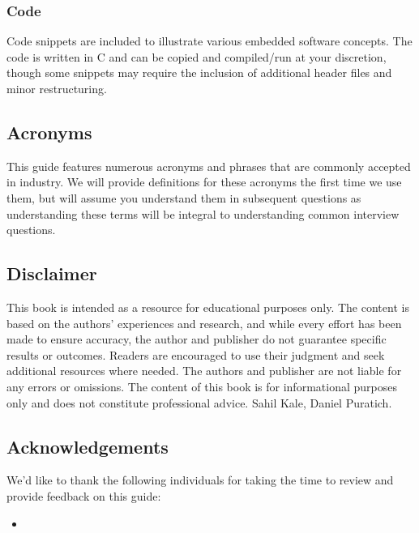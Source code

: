 \documentclass[main.tex]{subfiles}
\begin{document}
\subsubsection{Code}
Code snippets are included to illustrate various embedded software concepts. The code is written in C and can be copied and compiled/run at your discretion, though some snippets may require the inclusion of additional header files and minor restructuring.

\subsection{Acronyms}
This guide features numerous acronyms and phrases that are commonly accepted in industry. We will provide definitions for these acronyms the first time we use them, but will assume you understand them in subsequent questions as understanding these terms will be integral to understanding common interview questions. 

\subsection{Disclaimer}
This book is intended as a resource for educational purposes only. The content is based on the authors' experiences and research, and while every effort has been made to ensure accuracy, the author and publisher do not guarantee specific results or outcomes. Readers are encouraged to use their judgment and seek additional resources where needed. The authors and publisher are not liable for any errors or omissions. The content of this book is for informational purposes only and does not constitute professional advice.
\newline
\newnoindentpara \textcopyright Sahil Kale, Daniel Puratich.

\subsection{Acknowledgements}
We'd like to thank the following individuals for taking the time to review and provide feedback on this guide:
\begin{itemize}
    \item
\end{itemize}
\end{document}
